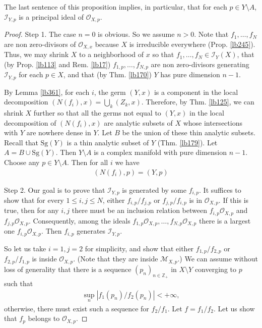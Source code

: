 \documentclass[12pt,b5paper,notitlepage]{report}
\theoremstyle{definition}
\theoremstyle{plain}
\newcommand{\scr}{\mathscr}
\newcommand{\Zbb}{\mathbb Z}
\newcommand{\Sg}{\mathrm{Sg}}
\numberwithin{equation}{section}
\begin{document}
The last sentence of this proposition implies, in particular, that for each $p\in Y\setminus A$, $\scr I_{Y,p}$ is a principal ideal of $\scr O_{X,p}$.


\begin{proof}
Step 1. The case $n=0$ is obvious. So we assume $n>0$. Note that $f_1,\dots,f_N$ are non zero-divisors of $\scr O_{X,x}$ because $X$ is irreducible everywhere (Prop. \ref{lb245}). Thus, we may shrink $X$ to a neighborhood of $x$ so that $f_1,\dots,f_N\in\scr I_Y(X)$, that (by Prop. \ref{lb113} and Rem. \ref{lb17}) $f_{1,p},\dots,f_{N,p}$ are non zero-divisors generating $\scr I_{Y,p}$ for each $p\in X$, and that (by Thm. \ref{lb170}) $Y$ has pure dimension $n-1$.

By Lemma \ref{lb361}, for each $i$, the germ $(Y,x)$ is a component in the local  decomposition $(N(f_i),x)=\bigcup_k (Z_k,x)$. Therefore, by Thm. \ref{lb125}, we can shrink $X$ further so that all the germs not equal to $(Y,x)$ in the local decomposition of $(N(f_i),x)$  are analytic subsets of $X$ whose intersections with $Y$ are nowhere dense in $Y$. Let $B$ be the union of these thin analytic subsets. Recall that $\Sg(Y)$ is a thin analytic subset of $Y$ (Thm. \ref{lb179}). Let $A=B\cup\Sg(Y)$. Then $Y\setminus A$ is a complex manifold with pure dimension $n-1$. Choose any $p\in Y\setminus A$. Then for all $i$ we have
\begin{align}
(N(f_i),p)=(Y,p)  \label{eq202}
\end{align}


Step 2. Our goal is to prove that $\scr I_{Y,p}$ is generated by some $f_{i,p}$. It suffices to show that for every $1\leq i,j\leq N$, either $f_{i,p}/f_{j,p}$ or $f_{j,p}/f_{i,p}$ is in $\scr O_{X,p}$. If this is true, then for any $i,j$ there must be an inclusion relation between $f_{i,p}\scr O_{X,p}$ and $f_{j,p}\scr O_{X,p}$. Consequently, among the ideals $f_{1,p}\scr O_{X,p},\dots,f_{N,p}\scr O_{X,p}$ there is a largest one $f_{i,p}\scr O_{X,p}$. Then $f_{i,p}$ generates $\scr I_{Y,p}$.

So let us take $i=1,j=2$ for simplicity, and show that either $f_{1,p}/f_{2,p}$ or $f_{2,p}/f_{1,p}$ is inside $\scr O_{X,p}$. (Note that they are inside $\scr M_{X,p}$.)  We can assume without loss of generality that there is a sequence $(p_n)_{n\in\Zbb_+}$ in $X\setminus Y$ converging to $p$ such that
\begin{align}
\sup_n|f_1(p_n)/f_2(p_n)|<+\infty,  \label{eq96}
\end{align}
otherwise, there must exist such a sequence for $f_2/f_1$. Let $f=f_1/f_2$. Let us show that $f_p$ belongs to $\scr O_{X,p}$.


\end{proof}
\end{document}
